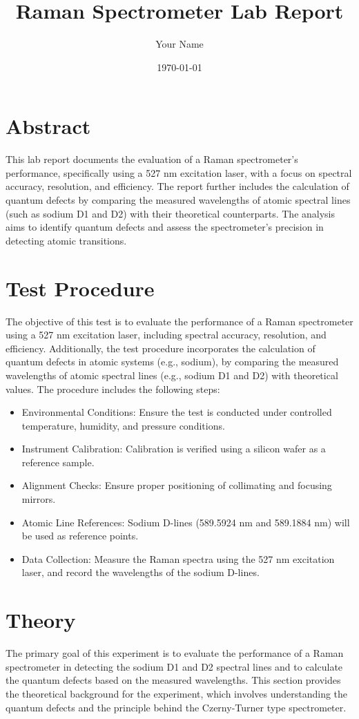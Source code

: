 \documentclass{article}
\title{Raman Spectrometer Lab Report}
\author{Your Name}
\date{\today}
\begin{document}
\maketitle
\section*{Abstract}
This lab report documents the evaluation of a Raman spectrometer's performance, specifically using a 527 nm excitation laser, with a focus on spectral accuracy, resolution, and efficiency. The report further includes the calculation of quantum defects by comparing the measured wavelengths of atomic spectral lines (such as sodium D1 and D2) with their theoretical counterparts. The analysis aims to identify quantum defects and assess the spectrometer's precision in detecting atomic transitions.
\section*{Test Procedure}
The objective of this test is to evaluate the performance of a Raman spectrometer using a 527 nm excitation laser, including spectral accuracy, resolution, and efficiency. Additionally, the test procedure incorporates the calculation of quantum defects in atomic systems (e.g., sodium), by comparing the measured wavelengths of atomic spectral lines (e.g., sodium D1 and D2) with theoretical values. The procedure includes the following steps:
\begin{itemize}
\item Environmental Conditions: Ensure the test is conducted under controlled temperature, humidity, and pressure conditions.
\item Instrument Calibration: Calibration is verified using a silicon wafer as a reference sample.
\item Alignment Checks: Ensure proper positioning of collimating and focusing mirrors.
\item Atomic Line References: Sodium D-lines (589.5924 nm and 589.1884 nm) will be used as reference points.
\item Data Collection: Measure the Raman spectra using the 527 nm excitation laser, and record the wavelengths of the sodium D-lines.
\end{itemize}
\section*{Theory}
The primary goal of this experiment is to evaluate the performance of a Raman spectrometer in detecting the sodium D1 and D2 spectral lines and to calculate the quantum defects based on the measured wavelengths. This section provides the theoretical background for the experiment, which involves understanding the quantum defects and the principle behind the Czerny-Turner type spectrometer.
\end{document}
